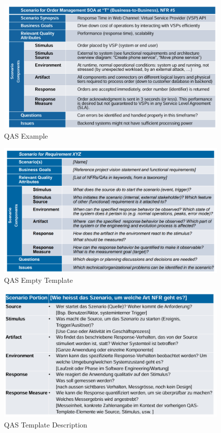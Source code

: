 \documentclass[../Main.tex]{subfiles}
\begin{document}
\begin{figure}[H] 
    \centering
    \includegraphics[width=1\linewidth]{Images/qas.png}
    \caption{QAS Example}
\end{figure}
\newpage
\begin{figure}[H] 
    \centering
    \includegraphics[width=1\linewidth]{Images/qas-template.png}
    \caption{QAS Empty Template}
\end{figure}
\begin{figure}[H] 
    \centering
    \includegraphics[width=1\linewidth]{Images/qas-template-2.png}
    \caption{QAS Template Description}
\end{figure}
\newpage
\end{document}
